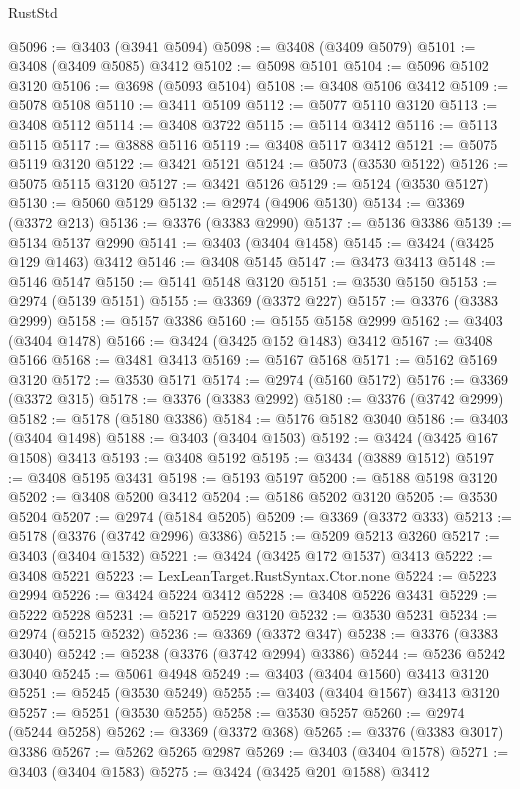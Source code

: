 \begin{lexlean}{RustStd}
\begin{coremodule}
@5096 := @3403 (@3941 @5094)
@5098 := @3408 (@3409 @5079)
@5101 := @3408 (@3409 @5085) @3412
@5102 := @5098 @5101
@5104 := @5096 @5102 @3120
@5106 := @3698 (@5093 @5104)
@5108 := @3408 @5106 @3412
@5109 := @5078 @5108
@5110 := @3411 @5109
@5112 := @5077 @5110 @3120
@5113 := @3408 @5112
@5114 := @3408 @3722
@5115 := @5114 @3412
@5116 := @5113 @5115
@5117 := @3888 @5116
@5119 := @3408 @5117 @3412
@5121 := @5075 @5119 @3120
@5122 := @3421 @5121
@5124 := @5073 (@3530 @5122)
@5126 := @5075 @5115 @3120
@5127 := @3421 @5126
@5129 := @5124 (@3530 @5127)
@5130 := @5060 @5129
@5132 := @2974 (@4906 @5130)
@5134 := @3369 (@3372 @213)
@5136 := @3376 (@3383 @2990)
@5137 := @5136 @3386
@5139 := @5134 @5137 @2990
@5141 := @3403 (@3404 @1458)
@5145 := @3424 (@3425 @129 @1463) @3412
@5146 := @3408 @5145
@5147 := @3473 @3413
@5148 := @5146 @5147
@5150 := @5141 @5148 @3120
@5151 := @3530 @5150
@5153 := @2974 (@5139 @5151)
@5155 := @3369 (@3372 @227)
@5157 := @3376 (@3383 @2999)
@5158 := @5157 @3386
@5160 := @5155 @5158 @2999
@5162 := @3403 (@3404 @1478)
@5166 := @3424 (@3425 @152 @1483) @3412
@5167 := @3408 @5166
@5168 := @3481 @3413
@5169 := @5167 @5168
@5171 := @5162 @5169 @3120
@5172 := @3530 @5171
@5174 := @2974 (@5160 @5172)
@5176 := @3369 (@3372 @315)
@5178 := @3376 (@3383 @2992)
@5180 := @3376 (@3742 @2999)
@5182 := @5178 (@5180 @3386)
@5184 := @5176 @5182 @3040
@5186 := @3403 (@3404 @1498)
@5188 := @3403 (@3404 @1503)
@5192 := @3424 (@3425 @167 @1508) @3413
@5193 := @3408 @5192
@5195 := @3434 (@3889 @1512)
@5197 := @3408 @5195 @3431
@5198 := @5193 @5197
@5200 := @5188 @5198 @3120
@5202 := @3408 @5200 @3412
@5204 := @5186 @5202 @3120
@5205 := @3530 @5204
@5207 := @2974 (@5184 @5205)
@5209 := @3369 (@3372 @333)
@5213 := @5178 (@3376 (@3742 @2996) @3386)
@5215 := @5209 @5213 @3260
@5217 := @3403 (@3404 @1532)
@5221 := @3424 (@3425 @172 @1537) @3413
@5222 := @3408 @5221
@5223 := LexLeanTarget.RustSyntax.Ctor.none
@5224 := @5223 @2994
@5226 := @3424 @5224 @3412
@5228 := @3408 @5226 @3431
@5229 := @5222 @5228
@5231 := @5217 @5229 @3120
@5232 := @3530 @5231
@5234 := @2974 (@5215 @5232)
@5236 := @3369 (@3372 @347)
@5238 := @3376 (@3383 @3040)
@5242 := @5238 (@3376 (@3742 @2994) @3386)
@5244 := @5236 @5242 @3040
@5245 := @5061 @4948
@5249 := @3403 (@3404 @1560) @3413 @3120
@5251 := @5245 (@3530 @5249)
@5255 := @3403 (@3404 @1567) @3413 @3120
@5257 := @5251 (@3530 @5255)
@5258 := @3530 @5257
@5260 := @2974 (@5244 @5258)
@5262 := @3369 (@3372 @368)
@5265 := @3376 (@3383 @3017) @3386
@5267 := @5262 @5265 @2987
@5269 := @3403 (@3404 @1578)
@5271 := @3403 (@3404 @1583)
@5275 := @3424 (@3425 @201 @1588) @3412

\end{coremodule}
\end{lexlean}
